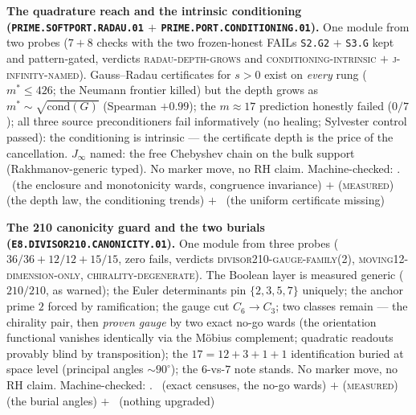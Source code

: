 \par\smallskip\noindent\textbf{The quadrature reach and the
intrinsic conditioning
(\texttt{PRIME.SOFTPORT.\allowbreak RADAU.01} $+$
\texttt{PRIME.PORT.\allowbreak CONDITIONING.01}).}
One module from two probes ($7 + 8$ checks with the two
frozen-honest FAILs \texttt{S2.G2} $+$ \texttt{S3.G} kept and
pattern-gated, verdicts \textsc{radau-depth-grows} and
\textsc{conditioning-intrinsic} $+$
\textsc{j-infinity-named}).  Gauss--Radau certificates for $s >
0$ exist on \emph{every} rung ($m^* \le 426$; the Neumann
frontier killed) but the depth grows as $m^* \sim
\sqrt{\mathrm{cond}(G)}$ (Spearman $+0.99$); the $m \approx 17$
prediction honestly failed ($0/7$); all three source
preconditioners fail informatively (no healing; Sylvester
control passed): the conditioning is intrinsic --- the
certificate depth is the price of the cancellation.  $J_\infty$
named: the free Chebyshev chain on the bulk support
(Rakhmanov-generic typed).  No marker move, no RH claim.
Machine-checked: .
\mE\ (the enclosure and monotonicity wards, congruence
invariance) $+$ (\textsc{measured}) (the depth law, the
conditioning trends) $+$ \mO\ (the uniform certificate missing)
\par\smallskip


\par\smallskip\noindent\textbf{The 210 canonicity guard and the
two burials
(\texttt{E8.DIVISOR210.\allowbreak CANONICITY.01}).}
One module from three probes ($36/36 + 12/12 + 15/15$, zero
fails, verdicts \textsc{divisor210-gauge-family(2)},
\textsc{moving12-dimension-only},
\textsc{chirality-degenerate}).  The Boolean layer is measured
generic ($210/210$, as warned); the Euler determinants pin
$\{2,3,5,7\}$ uniquely; the anchor prime $2$ forced by
ramification; the gauge cut $C_6 \to C_3$; two classes remain
--- the chirality pair, then \emph{proven gauge} by two exact
no-go wards (the orientation functional vanishes identically
via the M\"obius complement; quadratic readouts provably blind
by transposition); the $17 = 12{+}3{+}1{+}1$ identification
buried at space level (principal angles ${\sim}90^\circ$); the
$6$-vs-$7$ note stands.  No marker move, no RH claim.
Machine-checked: .
\mE\ (exact censuses, the no-go wards) $+$
(\textsc{measured}) (the burial angles) $+$ \mO\ (nothing
upgraded)
\par\smallskip


